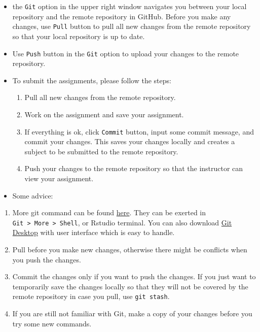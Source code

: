 \documentclass[
]{book}
\providecommand{\tightlist}{%
  \setlength{\itemsep}{0pt}\setlength{\parskip}{0pt}}
\begin{document}
\begin{itemize}
\item
  the \texttt{Git} option in the upper right window navigates you between your local repository and the remote repository in GitHub. Before you make any changes, use \texttt{Pull} button to pull all new changes from the remote repository so that your local repository is up to date.
\item
  Use \texttt{Push} button in the \texttt{Git} option to upload your changes to the remote repository.
\item
  To submit the assignments, please follow the steps:

  \begin{enumerate}
  \def\labelenumi{\arabic{enumi}.}
  \tightlist
  \item
    Pull all new changes from the remote repository.
  \item
    Work on the assignment and save your assignment.
  \item
    If everything is ok, click \texttt{Commit} button, input some commit message, and commit your changes. This saves your changes locally and creates a subject to be submitted to the remote repository.
  \item
    Push your changes to the remote repository so that the instructor can view your assignment.
  \end{enumerate}
\item
  Some advice:
\end{itemize}

\begin{enumerate}
\def\labelenumi{\arabic{enumi}.}
\tightlist
\item
  More git command can be found \href{https://docs.github.com/en/github/using-git}{here}. They can be exerted in \texttt{Git\ \textgreater{}\ More\ \textgreater{}\ Shell}, or Rstudio terminal. You can also download \href{https://git-scm.com/download/win}{Git Desktop} with user interface which is easy to handle.
\item
  Pull before you make new changes, otherwise there might be conflicts when you push the changes.\\
\item
  Commit the changes only if you want to push the changes. If you just want to temporarily save the changes locally so that they will not be covered by the remote repository in case you pull, use \texttt{git\ stash}.
\item
  If you are still not familiar with Git, make a copy of your changes before you try some new commands.
\end{enumerate}
\end{document}
